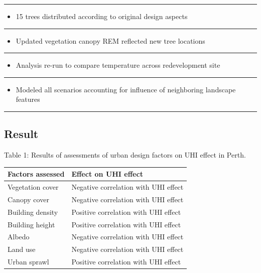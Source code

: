 \documentclass[
  letterpaper,
  DIV=11,
  numbers=noendperiod]{scrreprt}
\providecommand{\tightlist}{%
  \setlength{\itemsep}{0pt}\setlength{\parskip}{0pt}}\usepackage{longtable,booktabs,array}
\begin{document}
\begin{center}\rule{0.5\linewidth}{0.5pt}\end{center}

\begin{itemize}
\tightlist
\item
  15 trees distributed according to original design aspects
\end{itemize}

\begin{center}\rule{0.5\linewidth}{0.5pt}\end{center}

\begin{itemize}
\tightlist
\item
  Updated vegetation canopy REM reflected new tree locations
\end{itemize}

\begin{center}\rule{0.5\linewidth}{0.5pt}\end{center}

\begin{itemize}
\tightlist
\item
  Analysis re-run to compare temperature across redevelopment site
\end{itemize}

\begin{center}\rule{0.5\linewidth}{0.5pt}\end{center}

\begin{itemize}
\tightlist
\item
  Modeled all scenarios accounting for influence of neighboring
  landscape features
\end{itemize}

\begin{center}\rule{0.5\linewidth}{0.5pt}\end{center}

\hypertarget{result}{%
\subsection{Result}\label{result}}

Table 1: Results of assessments of urban design factors on UHI effect in
Perth.

\begin{longtable}[]{@{}ll@{}}
\toprule()
Factors assessed & Effect on UHI effect \\
\midrule()
\endhead
Vegetation cover & Negative correlation with UHI effect \\
Canopy cover & Negative correlation with UHI effect \\
Building density & Positive correlation with UHI effect \\
Building height & Positive correlation with UHI effect \\
Albedo & Negative correlation with UHI effect \\
Land use & Negative correlation with UHI effect \\
Urban sprawl & Positive correlation with UHI effect \\
\bottomrule()
\end{longtable}
\end{document}
